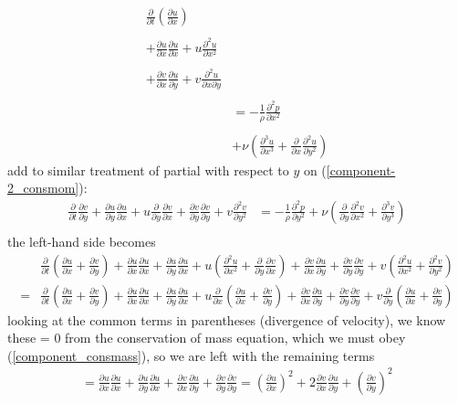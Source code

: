 \documentclass[11pt]{article}
\newcommand{\D}[2][]{\frac{\partial#1}{\partial#2}}
\begin{document}
\begin{align}
\frac{\partial}{\partial t} \left( \frac{\partial u}{\partial x} \right) &
	\nonumber \\ \nonumber \\
+ \frac{\partial u}{\partial x} \frac{\partial u}{\partial x}
 + u \frac{\partial^2 u}{\partial x^2}	 &
	\nonumber \\ \nonumber \\
+ \frac{\partial v}{\partial x} \frac{\partial u}{\partial y}
 + v \frac{\partial^2 u}{\partial x \partial y}
 	\nonumber \\ \nonumber \\
& = -\frac{1}{\rho} \frac{\partial^2 p}{\partial x^2}
	\nonumber \\ \nonumber \\
& + \nu \left( \D[^3u]{x^3} + \D{x} \D[^2u]{y^2} \right)
	\nonumber %
\end{align}
add to similar treatment of partial with respect to $y$ on (\ref{component-2_consmom}):
\begin{align}
\D{t} \D[v]{y} + \D[u]{y}\D[u]{x} + u \D{y}\D[v]{x} + \D[v]{y}\D[v]{y} + v \D[^2 v]{y^2}
& = -\frac{1}{\rho} \frac{\partial^2 p}{\partial y^2}
 + \nu \left( \D{y} \D[^2v]{x^2} + \D[^3v]{y^3} \right)
	\nonumber \\ \nonumber
\end{align}
the left-hand side becomes
\begin{align}
&\D{t} \left( \D[u]{x} + \D[v]{y} \right)
	+ \D[u]{x}\D[u]{x} + \D[u]{y}\D[u]{x}
	+ u \left( \D[^2u]{x^2} + \D{y}\D[v]{x} \right)
	+ \D[v]{x}\D[u]{y} + \D[v]{y}\D[v]{y}
	+ v \left( \D[^2u]{x^2} + \D[^2v]{y^2} \right)
	\nonumber \\ \nonumber
= &\D{t} \left( \D[u]{x} + \D[v]{y} \right)
	+ \D[u]{x}\D[u]{x} + \D[u]{y}\D[u]{x}
	+ u \D{x} \left( \D[u]{x} + \D[v]{y} \right)
	+ \D[v]{x}\D[u]{y} + \D[v]{y}\D[v]{y}
	+ v \D{y} \left( \D[u]{x} + \D[v]{y} \right)
\end{align}
looking at the common terms in parentheses (divergence of velocity),
we know these = 0 from the conservation of mass equation, which we must obey (\ref{component_consmass}), so we are left with the remaining terms
\begin{align}
= \D[u]{x}\D[u]{x} + \D[u]{y}\D[u]{x}
	+ \D[v]{x}\D[u]{y} + \D[v]{y}\D[v]{y}
= \left(\D[u]{x}\right)^2 + 2\D[v]{x}\D[u]{y} + \left(\D[v]{y}\right)^2
\label{lhs}
\end{align}
\end{document}
